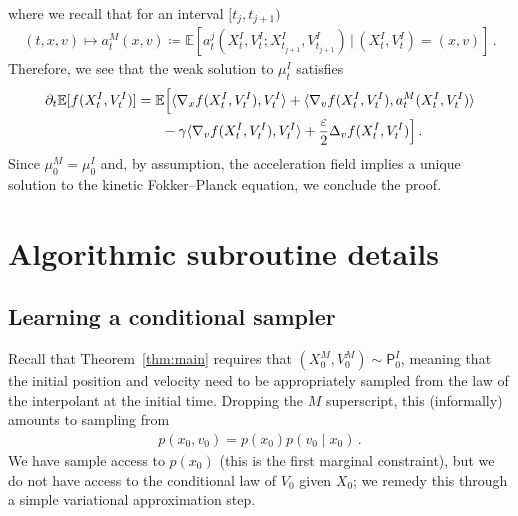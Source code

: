 \documentclass[12pt]{article}
\theoremstyle{plain}
\theoremstyle{plain}
\theoremstyle{remark}
\newcommand{\bbE}{\mathbb{E}}
\newcommand*{\defeq}{\coloneqq}
\newcommand{\msf}[1]{\mathsf{#1}}
\newcommand{\eps}{\varepsilon}
\newcommand{\1}{\bm{1}}
\theoremstyle{plain}
\theoremstyle{definition}
\theoremstyle{remark}
\begin{document}
where we recall that for an interval $[t_j,t_{j+1})$
\begin{align*}
    (t,x,v)\mapsto a_t^{M}(x,v) \defeq \bbE[a_t^j(X_t^I, V_t^I;X_{t_{j+1}}^I, V_{t_{j+1}}^I)\,|\,(X_t^I,V_t^I) = (x,v)]\,.
\end{align*}
Therefore, we see that the weak solution to $\mu_t^I$ satisfies
\begin{align*}
    \partial_t \bbE[f(X_t^I,V_t^I)] &= \bbE\Bigl[ \langle \nabla_x f(X_t^I,V_t^I), V_t^I \rangle + \langle \nabla_v f(X_t^I,V_t^I), a_t^{M}(X_t^I,V_t^I)\rangle \\
    &\phantom{=}\quad -\gamma \langle \nabla_v f(X_t^I, V_t^I), V_t^I \rangle + \frac{\eps}{2}\Delta_vf(X_t^I, V_t^I)\Bigr]\,.
\end{align*}
Since $\mu_0^M = \mu_0^I$ and, by assumption, the acceleration field implies a unique solution to the kinetic Fokker--Planck equation, we conclude the proof.


\section{Algorithmic subroutine details}
\subsection{Learning a conditional sampler}\label{sec:cond_sampling}
Recall that Theorem~\ref{thm:main} requires that $(X_0^M,V_0^M) \sim \msf P_0^I$, meaning that the initial position and velocity need to be appropriately sampled from the law of the interpolant at the initial time. Dropping the $M$ superscript, this (informally) amounts to sampling from
\begin{align*}
    p(x_0,v_0) = p(x_0) p(v_0\mid x_0)\,.
\end{align*}
We have sample access to $p(x_0)$ (this is the first marginal constraint), but we do not have access to the conditional law of $V_0$ given $X_0$; we remedy this through a simple variational approximation step.
\end{document}

